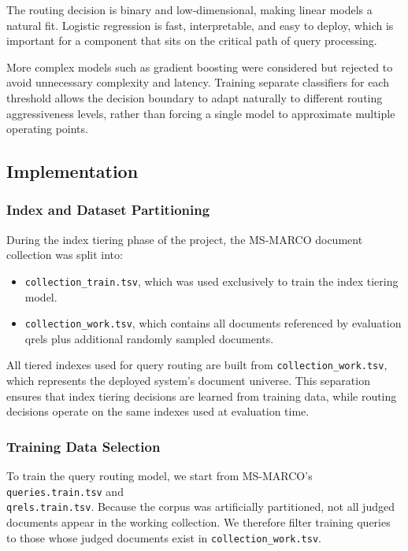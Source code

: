 \documentclass[11pt]{article}
\begin{document}
The routing decision is binary and low-dimensional, making linear models a natural fit. Logistic regression is fast, interpretable, and easy to deploy, which is important for a component that sits on the critical path of query processing.

More complex models such as gradient boosting were considered but rejected to avoid unnecessary complexity and latency. Training separate classifiers for each threshold allows the decision boundary to adapt naturally to different routing aggressiveness levels, rather than forcing a single model to approximate multiple operating points.

\subsection{Implementation}

\subsubsection{Index and Dataset Partitioning}

During the index tiering phase of the project, the MS-MARCO document collection was split into:
\begin{itemize}
    \item \texttt{collection\_train.tsv}, which was used exclusively to train the index tiering model.
    \item \texttt{collection\_work.tsv}, which contains all documents referenced by evaluation qrels plus additional randomly sampled documents.
\end{itemize}

\noindent All tiered indexes used for query routing are built from \texttt{collection\_work.tsv}, which represents the deployed system’s document universe. This separation ensures that index tiering decisions are learned from training data, while routing decisions operate on the same indexes used at evaluation time.

\subsubsection{Training Data Selection}

To train the query routing model, we start from MS-MARCO’s \texttt{queries.train.tsv} and \\\texttt{qrels.train.tsv}. Because the corpus was artificially partitioned, not all judged documents appear in the working collection. We therefore filter training queries to those whose judged documents exist in \texttt{collection\_work.tsv}.
\end{document}
